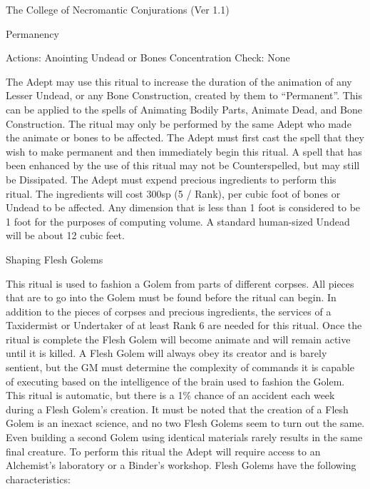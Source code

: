 \begin{Chapter}{The College of Necromantic Conjurations (Ver 1.1)}
\begin{ritual}[R-3]{Permanency}


Actions: Anointing Undead or Bones 
Concentration Check: None 
\begin{effects}
The Adept may use this ritual to increase the duration of the
animation of any Lesser Undead, or any Bone Construction, created by
them to “Permanent”.  This can be applied to the spells of Animating
Bodily Parts, Animate Dead, and Bone Construction. The ritual may only
be performed by the same Adept who made the animate or bones to be
affected. The Adept must first cast the spell that they wish to make
permanent and then immediately begin this ritual.  A spell that has
been enhanced by the use of this ritual may not be Counterspelled,
but may still be Dissipated.  The Adept must expend precious
ingredients to perform this ritual.  The ingredients will cost 300sp
(5 / Rank), per cubic foot of bones or Undead to be affected.  Any
dimension that is less than 1 foot is considered to be 1 foot for the
purposes of computing volume.  A standard human-sized Undead will be
about 12 cubic feet.
\end{effects}
\end{ritual}

\begin{ritual}[R-4]{Shaping Flesh Golems}

\begin{effects}
This ritual is used to fashion a Golem from parts of different
corpses. All pieces that are to go into the Golem must be found before
the ritual can begin.  In addition to the pieces of corpses and
precious ingredients, the services of a Taxidermist or Undertaker of
at least Rank 6 are needed for this ritual. Once the ritual is
complete the Flesh Golem will become animate and will remain active
until it is killed. A Flesh Golem will always obey its creator and is
barely sentient, but the GM must determine the complexity of commands
it is capable of executing based on the intelligence of the brain used
to fashion the Golem. This ritual is automatic, but there is a 1\%
chance of an accident each week during a Flesh Golem’s creation.  It
must be noted that the creation of a Flesh Golem is an inexact
science, and no two Flesh Golems seem to turn out the same.  Even
building a second Golem using identical materials rarely results in
the same final creature.  To perform this ritual the Adept will
require access to an Alchemist’s laboratory or a Binder’s
workshop. Flesh Golems have the following characteristics:


\end{effects}
\end{ritual}
\end{Chapter}
